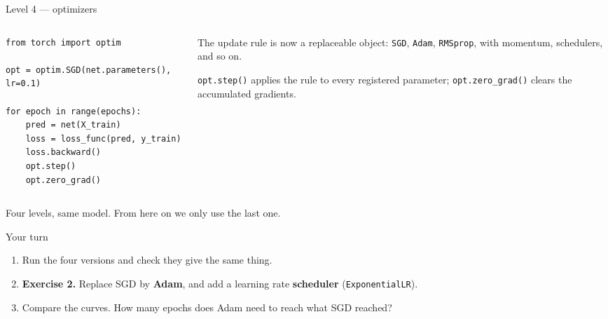 \documentclass[aspectratio=169,10pt]{beamer}
\begin{document}
\begin{frame}[fragile]{Level 4 --- optimizers}
\begin{columns}[T]
\begin{column}{.5\textwidth}
\begin{lstlisting}
from torch import optim

opt = optim.SGD(net.parameters(), lr=0.1)

for epoch in range(epochs):
    pred = net(X_train)
    loss = loss_func(pred, y_train)
    loss.backward()
    opt.step()
    opt.zero_grad()
\end{lstlisting}
\end{column}
\begin{column}{.47\textwidth}
\small
The update rule is now a replaceable object: \texttt{SGD}, \texttt{Adam},
\texttt{RMSprop}, with momentum, schedulers, and so on.

\medskip
\texttt{opt.step()} applies the rule to every registered parameter;
\texttt{opt.zero\_grad()} clears the accumulated gradients.
\end{column}
\end{columns}
\vspace{.4em}
\begin{center}\small
Four levels, same model. From here on we only use the last one.
\end{center}
\end{frame}

\begin{frame}{Your turn}
\begin{practice}
\begin{enumerate}
  \item Run the four versions and check they give the same thing.
  \item \textbf{Exercise 2.} Replace SGD by \textbf{Adam}, and add a learning rate
        \textbf{scheduler} (\texttt{ExponentialLR}).
  \item Compare the curves. How many epochs does Adam need to reach what SGD reached?
\end{enumerate}
\end{practice}
\end{frame}
\end{document}
